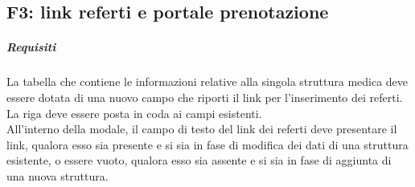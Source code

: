 % 


% 

% 


% 


% 

\subsection{F3: link referti e portale prenotazione}
\subparagraph{Requisiti}
La tabella che contiene le informazioni relative alla singola struttura medica deve essere dotata di una nuovo campo che riporti il link per l'inserimento dei referti.\\
La riga deve essere posta in coda ai campi esistenti.\\ 
All'interno della modale, il campo di testo del link dei referti deve presentare il link, qualora esso sia presente e si sia in fase di modifica dei dati di una struttura esistente, o essere vuoto, qualora esso sia assente e si sia in fase di aggiunta di una nuova struttura.

